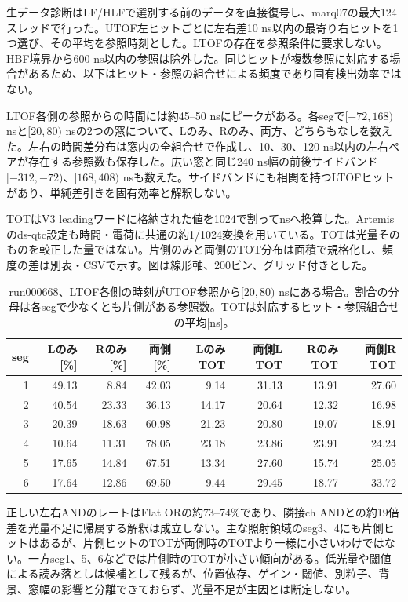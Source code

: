 生データ診断はLF/HLFで選別する前のデータを直接復号し、marq07の最大124スレッドで行った。UTOF左ヒットごとに左右差10 ns以内の最寄り右ヒットを1つ選び、その平均を参照時刻とした。LTOFの存在を参照条件に要求しない。HBF境界から600 ns以内の参照は除外した。同じヒットが複数参照に対応する場合があるため、以下はヒット・参照の組合せによる頻度であり固有検出効率ではない。

LTOF各側の参照からの時間には約45--50 nsにピークがある。各segで$[-72,168)$ nsと$[20,80)$ nsの2つの窓について、Lのみ、Rのみ、両方、どちらもなしを数えた。左右の時間差分布は窓内の全組合せで作成し、10、30、120 ns以内の左右ペアが存在する参照数も保存した。広い窓と同じ240 ns幅の前後サイドバンド$[-312,-72)$、$[168,408)$ nsも数えた。サイドバンドにも相関を持つLTOFヒットがあり、単純差引きを固有効率と解釈しない。

TOTはV3 leadingワードに格納された値を1024で割ってnsへ換算した。Artemisのds-qtc設定も時間・電荷に共通の約1/1024変換を用いている。TOTは光量そのものを較正した量ではない。片側のみと両側のTOT分布は面積で規格化し、頻度の差は別表・CSVで示す。図は線形軸、200ビン、グリッド付きとした。
\begin{table}[htbp]\centering\small
\caption{run000668、LTOF各側の時刻がUTOF参照から$[20,80)$ nsにある場合。割合の分母は各segで少なくとも片側がある参照数。TOTは対応するヒット・参照組合せの平均[ns]。}
\begin{tabular}{rrrrrrrr}\hline
seg & Lのみ[\%] & Rのみ[\%] & 両側[\%] & LのみTOT & 両側L TOT & RのみTOT & 両側R TOT \\\hline
1 & 49.13 & 8.84 & 42.03 & 9.14 & 31.13 & 13.91 & 27.60 \\
2 & 40.54 & 23.33 & 36.13 & 14.17 & 20.64 & 12.32 & 16.98 \\
3 & 20.39 & 18.63 & 60.98 & 21.23 & 20.80 & 19.07 & 18.91 \\
4 & 10.64 & 11.31 & 78.05 & 23.18 & 23.86 & 23.91 & 24.24 \\
5 & 17.65 & 14.84 & 67.51 & 13.34 & 27.60 & 15.74 & 25.05 \\
6 & 17.64 & 12.86 & 69.50 & 9.44 & 29.45 & 18.77 & 33.72 \\
\hline\end{tabular}\end{table}

正しい左右ANDのレートはFlat ORの約73--74\%であり、隣接ch ANDとの約19倍差を光量不足に帰属する解釈は成立しない。主な照射領域のseg3、4にも片側ヒットはあるが、片側ヒットのTOTが両側時のTOTより一様に小さいわけではない。一方seg1、5、6などでは片側時のTOTが小さい傾向がある。低光量や閾値による読み落としは候補として残るが、位置依存、ゲイン・閾値、別粒子、背景、窓幅の影響と分離できておらず、光量不足が主因とは断定しない。

